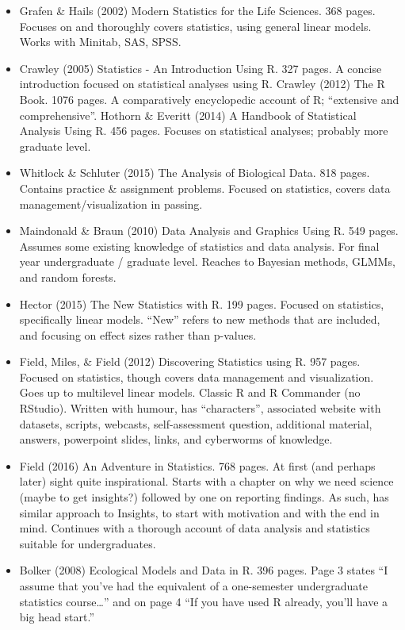 \documentclass[]{book}
\providecommand{\tightlist}{%
  \setlength{\itemsep}{0pt}\setlength{\parskip}{0pt}}
\begin{document}
\begin{itemize}
\tightlist
\item
  Grafen \& Hails (2002) Modern Statistics for the Life Sciences. 368 pages. Focuses on and thoroughly covers statistics, using general linear models. Works with Minitab, SAS, SPSS.
\item
  Crawley (2005) Statistics - An Introduction Using R. 327 pages. A concise introduction focused on statistical analyses using R.
  Crawley (2012) The R Book. 1076 pages. A comparatively encyclopedic account of R; ``extensive and comprehensive''.
  Hothorn \& Everitt (2014) A Handbook of Statistical Analysis Using R. 456 pages. Focuses on statistical analyses; probably more graduate level.
\item
  Whitlock \& Schluter (2015) The Analysis of Biological Data. 818 pages. Contains practice \& assignment problems. Focused on statistics, covers data management/visualization in passing.
\item
  Maindonald \& Braun (2010) Data Analysis and Graphics Using R. 549 pages. Assumes some existing knowledge of statistics and data analysis. For final year undergraduate / graduate level. Reaches to Bayesian methods, GLMMs, and random forests.
\item
  Hector (2015) The New Statistics with R. 199 pages. Focused on statistics, specifically linear models. ``New'' refers to new methods that are included, and focusing on effect sizes rather than p-values.
\item
  Field, Miles, \& Field (2012) Discovering Statistics using R. 957 pages. Focused on statistics, though covers data management and visualization. Goes up to multilevel linear models. Classic R and R Commander (no RStudio). Written with humour, has ``characters'', associated website with datasets, scripts, webcasts, self-assessment question, additional material, answers, powerpoint slides, links, and cyberworms of knowledge.
\item
  Field (2016) An Adventure in Statistics. 768 pages. At first (and perhaps later) sight quite inspirational. Starts with a chapter on why we need science (maybe to get insights?) followed by one on reporting findings. As such, has similar approach to Insights, to start with motivation and with the end in mind. Continues with a thorough account of data analysis and statistics suitable for undergraduates.
\item
  Bolker (2008) Ecological Models and Data in R. 396 pages. Page 3 states ``I assume that you've had the equivalent of a one-semester undergraduate statistics course\ldots{}'' and on page 4 ``If you have used R already, you'll have a big head start.''

\end{itemize}
\end{document}
